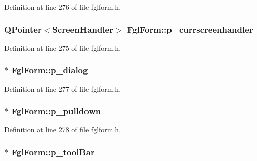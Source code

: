 Definition at line 276 of file fglform.h.

\hypertarget{classFglForm_a98e11b2d55100f907821e3a8281b4ab5}{
\subsubsection[{p\_\-currscreenhandler}]{\setlength{\rightskip}{0pt plus 5cm}QPointer$<$ScreenHandler$>$ {\bf FglForm::p\_\-currscreenhandler}}}
\label{classFglForm_a98e11b2d55100f907821e3a8281b4ab5}


Definition at line 275 of file fglform.h.

\hypertarget{classFglForm_afa28d86c6e353e3e31c677b463199a4a}{
\subsubsection[{p\_\-dialog}]{$\ast$ {\bf FglForm::p\_\-dialog}}}
\label{classFglForm_afa28d86c6e353e3e31c677b463199a4a}


Definition at line 277 of file fglform.h.

\hypertarget{classFglForm_a87a0ac69973f45c48fb629d04ac5b364}{
\subsubsection[{p\_\-pulldown}]{$\ast$ {\bf FglForm::p\_\-pulldown}}}
\label{classFglForm_a87a0ac69973f45c48fb629d04ac5b364}


Definition at line 278 of file fglform.h.

\hypertarget{classFglForm_a63ee680575b50bd02473649cd3d272f5}{
\subsubsection[{p\_\-toolBar}]{$\ast$ {\bf FglForm::p\_\-toolBar}}}
\label{classFglForm_a63ee680575b50bd02473649cd3d272f5}


